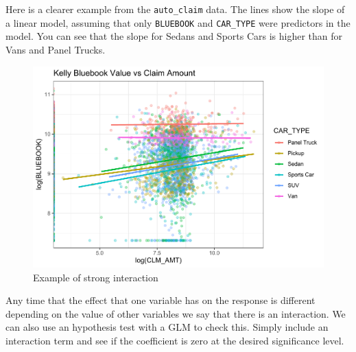 \documentclass[openany]{book}
\newenvironment{Shaded}{\begin{snugshade}}{\end{snugshade}}
\newcommand{\DataTypeTok}[1]{\textcolor[rgb]{0.13,0.29,0.53}{#1}}
\newcommand{\FloatTok}[1]{\textcolor[rgb]{0.00,0.00,0.81}{#1}}
\newcommand{\KeywordTok}[1]{\textcolor[rgb]{0.13,0.29,0.53}{\textbf{#1}}}
\newcommand{\NormalTok}[1]{#1}
\newcommand{\OperatorTok}[1]{\textcolor[rgb]{0.81,0.36,0.00}{\textbf{#1}}}
\newcommand{\StringTok}[1]{\textcolor[rgb]{0.31,0.60,0.02}{#1}}
\begin{document}
Here is a clearer example from the \texttt{auto\_claim} data. The lines show the slope of a linear model, assuming that only \texttt{BLUEBOOK} and \texttt{CAR\_TYPE} were predictors in the model. You can see that the slope for Sedans and Sports Cars is higher than for Vans and Panel Trucks.

\begin{Shaded}
\end{Shaded}

\begin{figure}
\centering
\includegraphics{05-linear-models_files/figure-latex/unnamed-chunk-24-1.pdf}
\caption{\label{fig:unnamed-chunk-24}Example of strong interaction}
\end{figure}

Any time that the effect that one variable has on the response is different depending on the value of other variables we say that there is an interaction. We can also use an hypothesis test with a GLM to check this. Simply include an interaction term and see if the coefficient is zero at the desired significance level.
\end{document}
